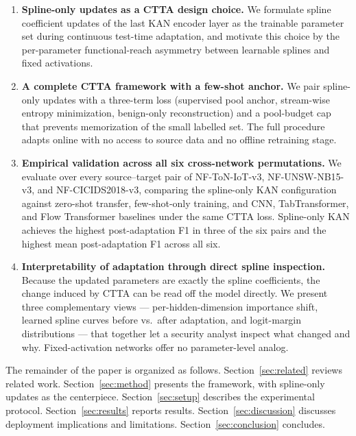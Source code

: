 \documentclass[10pt, conference, letterpaper]{IEEEtran}
\begin{document}
\begin{enumerate}
    \item \textbf{Spline-only updates as a CTTA design choice.} We formulate spline coefficient updates of the last KAN encoder layer as the trainable parameter set during continuous test-time adaptation, and motivate this choice by the per-parameter functional-reach asymmetry between learnable splines and fixed activations.

    \item \textbf{A complete CTTA framework with a few-shot anchor.} We pair spline-only updates with a three-term loss (supervised pool anchor, stream-wise entropy minimization, benign-only reconstruction) and a pool-budget cap that prevents memorization of the small labelled set. The full procedure adapts online with no access to source data and no offline retraining stage.

    \item \textbf{Empirical validation across all six cross-network permutations.} We evaluate over every source--target pair of NF-ToN-IoT-v3, NF-UNSW-NB15-v3, and NF-CICIDS2018-v3, comparing the spline-only KAN configuration against zero-shot transfer, few-shot-only training, and CNN, TabTransformer, and Flow Transformer baselines under the same CTTA loss. Spline-only KAN achieves the highest post-adaptation F1 in three of the six pairs and the highest mean post-adaptation F1 across all six.

    \item \textbf{Interpretability of adaptation through direct spline inspection.} Because the updated parameters are exactly the spline coefficients, the change induced by CTTA can be read off the model directly. We present three complementary views --- per-hidden-dimension importance shift, learned spline curves before vs.\ after adaptation, and logit-margin distributions --- that together let a security analyst inspect what changed and why. Fixed-activation networks offer no parameter-level analog.
\end{enumerate}

The remainder of the paper is organized as follows. Section~\ref{sec:related} reviews related work. Section~\ref{sec:method} presents the framework, with spline-only updates as the centerpiece. Section~\ref{sec:setup} describes the experimental protocol. Section~\ref{sec:results} reports results. Section~\ref{sec:discussion} discusses deployment implications and limitations. Section~\ref{sec:conclusion} concludes.
\end{document}
